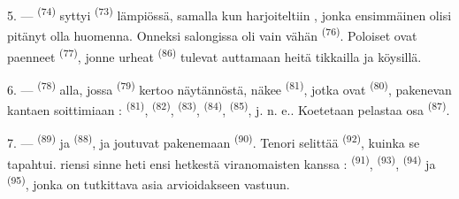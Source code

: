 5. ---  \textsuperscript{(74)} syttyi 
\textsuperscript{(73)} lämpiössä, samalla kun harjoiteltiin ,
jonka ensimmäinen  olisi pitänyt olla huomenna. Onneksi
salongissa oli vain vähän  \textsuperscript{(76)}. Poloiset
ovat paenneet  \textsuperscript{(77)}, jonne urheat
 \textsuperscript{(86)} tulevat auttamaan heitä tikkailla ja
köysillä.

6. ---  \textsuperscript{(78)} alla, jossa
 \textsuperscript{(79)} kertoo näytännöstä, näkee
 \textsuperscript{(81)}, jotka ovat 
\textsuperscript{(80)}, pakenevan kantaen soittimiaan : 
\textsuperscript{(81)},  \textsuperscript{(82)},
 \textsuperscript{(83)}, 
\textsuperscript{(84)},  \textsuperscript{(85)}, j. n. e..
Koetetaan pelastaa osa  \textsuperscript{(87)}.

7. ---  \textsuperscript{(89)} ja
 \textsuperscript{(88)},  ja
 joutuvat pakenemaan 
\textsuperscript{(90)}. Tenori selittää 
\textsuperscript{(92)}, kuinka se tapahtui.  riensi sinne
heti ensi hetkestä viranomaisten kanssa : 
\textsuperscript{(91)},  \textsuperscript{(93)},
 \textsuperscript{(94)} ja  \textsuperscript{(95)}, jonka on tutkittava asia arvioidakseen
vastuun.
\VUsaut{6.0mm}
\VUfilet{22mm}
